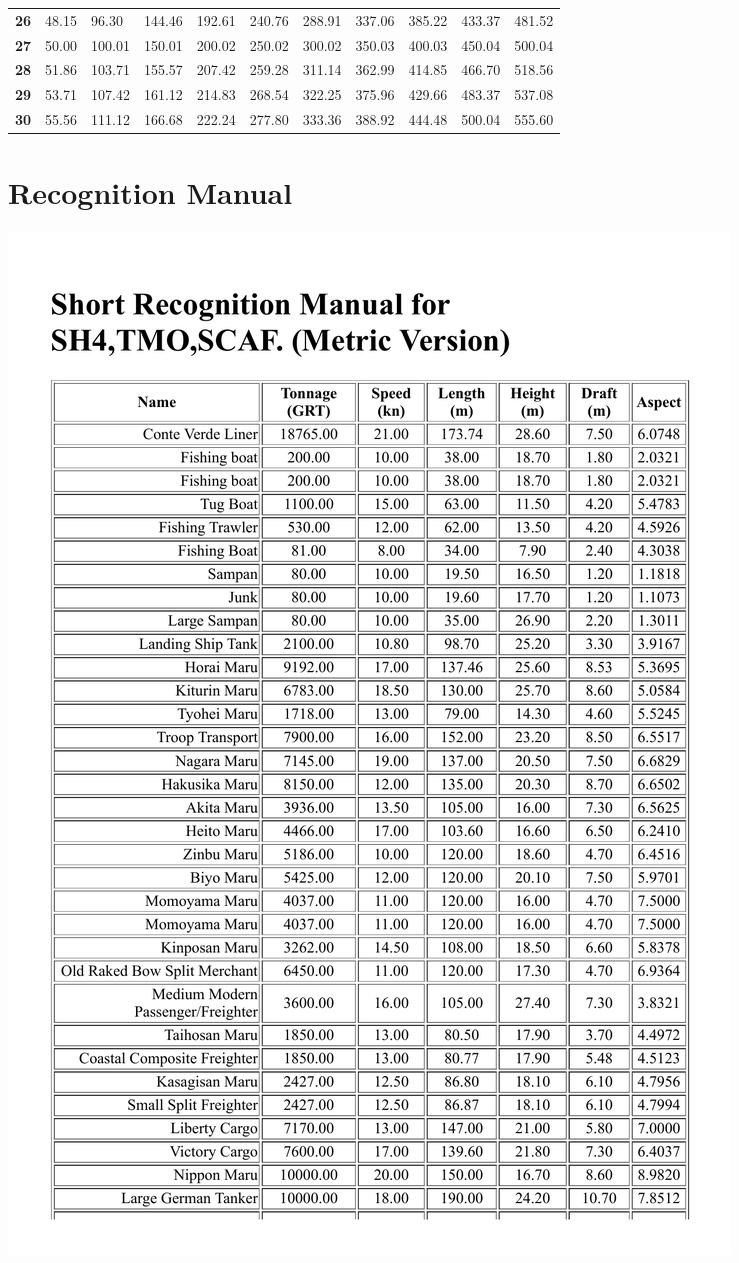 \documentclass{article}
\begin{document}
\begin{table}[h]
\begin{tabular}{lllllllllll}
\textbf{26}      & 48.15      & 96.30      & 144.46     & 192.61     & 240.76     & 288.91     & 337.06     & 385.22     & 433.37     & 481.52      \\
\textbf{27}      & 50.00      & 100.01     & 150.01     & 200.02     & 250.02     & 300.02     & 350.03     & 400.03     & 450.04     & 500.04      \\
\textbf{28}      & 51.86      & 103.71     & 155.57     & 207.42     & 259.28     & 311.14     & 362.99     & 414.85     & 466.70     & 518.56      \\
\textbf{29}      & 53.71      & 107.42     & 161.12     & 214.83     & 268.54     & 322.25     & 375.96     & 429.66     & 483.37     & 537.08      \\
\textbf{30}      & 55.56      & 111.12     & 166.68     & 222.24     & 277.80     & 333.36     & 388.92     & 444.48     & 500.04     & 555.60     
\end{tabular}
\end{table}

\section{Recognition Manual}
\includegraphics[pages={1-4}, width=\textwidth, height=\textheight]{ShortRecogMan.pdf}
\end{document}
